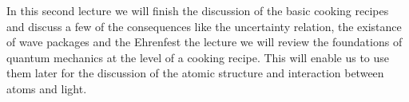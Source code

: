 In this second lecture we will finish the discussion of the basic cooking recipes and discuss a few of the consequences like the uncertainty relation, the existance of wave packages and the Ehrenfest the lecture we will review the foundations of quantum mechanics at the level of a cooking recipe. This will enable us to use them later for the discussion of the atomic structure and interaction between atoms and light.